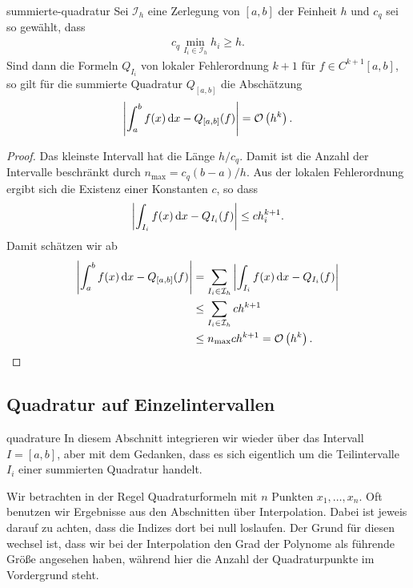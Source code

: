 \begin{Satz}{summierte-quadratur}
  Sei $\mathcal I_h$ eine Zerlegung von $[a,b]$ der Feinheit $h$ und
  $c_q$ sei so gewählt, dass
  \begin{gather}
    c_q \min_{I_i\in \mathcal I_h} h_i \ge h.
  \end{gather}
  Sind dann die Formeln $Q_{I_i}$ von lokaler Fehlerordnung $k+1$ für
  $f\in C^{k+1}[a,b]$, so gilt für die summierte Quadratur $Q_{[a,b]}$
  die Abschätzung
  \begin{gather}
    \left|\int_a^b f(x)\,\mathrm{d} x - Q_{[a,b]}(f)\right|
    = \mathcal O\left(h^{k}\right).
  \end{gather}
\end{Satz}

\begin{proof}
  Das kleinste Intervall hat die Länge $h/c_q$. Damit ist die Anzahl
  der Intervalle beschränkt durch $n_{\max}=c_q (b-a)/h$. Aus der
  lokalen Fehlerordnung ergibt sich die Existenz einer Konstanten $c$,
  so dass
  \begin{gather}
    \left|\int_{I_i} f(x)\,\mathrm{d} x - Q_{I_i}(f)\right| \le c h_i^{k+1}.
  \end{gather}
  Damit schätzen wir ab
  \begin{align}
    \left|\int_a^b f(x)\,\mathrm{d} x - Q_{[a,b]}(f)\right|
    &= \sum_{I_i\in\mathcal I_h}  \left|\int_{I_i} f(x)\,\mathrm{d} x - Q_{I_i}(f)\right|\\
    &\le \sum_{I_i\in\mathcal I_h} c h^{k+1}\\
    & \le n_{\max} c h^{k+1} = \mathcal O\left(h^{k}\right).
  \end{align}
\end{proof}

\subsection{Quadratur auf Einzelintervallen}

\begin{Notation}{quadrature}
  In diesem Abschnitt integrieren wir wieder über das Intervall
  $I=[a,b]$, aber mit dem Gedanken, dass es sich eigentlich um die
  Teilintervalle $I_i$ einer summierten Quadratur handelt.

  Wir betrachten in der Regel Quadraturformeln mit $n$ Punkten
  $x_1,\dots,x_n$. Oft benutzen wir Ergebnisse aus den Abschnitten
  über Interpolation. Dabei ist jeweis darauf zu achten, dass die
  Indizes dort bei null loslaufen. Der Grund für diesen wechsel ist,
  dass wir bei der Interpolation den Grad der Polynome als führende
  Größe angesehen haben, während hier die Anzahl der Quadraturpunkte
  im Vordergrund steht.
\end{Notation}

